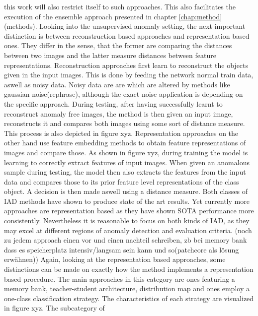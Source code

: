 this work will also restrict itself to such approaches. This also facilitates the execution of the ensemble approach presented in chapter \ref{chap:method}(methods).
\newline
Looking into the unsupervised anomaly setting, the next important distinction is between reconstruction based approaches and representation based ones. They differ in the sense, that the former 
are comparing the distances between two images and the latter measure distances between feature representations. \newline
Reconstruction approaches first learn to reconstruct the objects given in the input images. This is done by feeding the network normal train data, aswell as noisy data. Noisy data are are 
which are altered by methods like gaussian noise(rephrase), although the exact noise application is depending on the specific approach. During testing, after having successfully learnt to 
reconstruct anomaly free images, the method is then given an input image, reconstructs it and compares both images using some sort of distance measure. This process is also depicted in figure xyz. 
Representation approaches on the other hand use feature embedding methods to obtain feature representations of images and compare those. As shown in figure xyz, during training the model is 
learning to correctly extract features of input images. When given an anomalous sample during testing, the model then also extracts the features from the input data and compares those to its 
prior feature level representations of the class object. A decision is then made aswell using a distance measure.
Both classes of IAD methods have shown to produce state of the art results. Yet currently more approaches are representation based \cite{liu2024deep} as they have shown SOTA performance more 
consistently. Nevertheless it is reasonable to focus on both kinds of IAD, as they may excel at different regions of anomaly detection and evaluation criteria.
\newline
(noch zu jedem approach einen vor und einen nachteil schreiben, zb bei memory bank dass es speicherplatz intensiv/langsam sein kann und so(patchcore als lösung erwähnen))
Again, looking at the representation based approaches, some distinctions can be made on exactly how the method implements a representation based procedure.
The main approaches in this category are ones featuring a memory bank, teacher-student architecture, distribution map and ones employ a one-class classification strategy. The characteristics of 
each strategy are visualized in figure xyz. The subcategory of 
